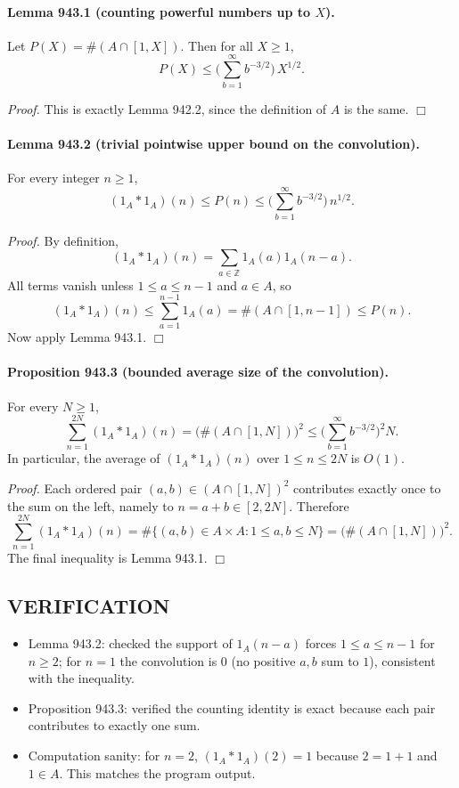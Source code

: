 \paragraph{Lemma 943.1 (counting powerful numbers up to $X$).}
Let $P(X)=\#(A\cap[1,X])$. Then for all $X\ge 1$,
\[
P(X) \le \Big(\sum_{b=1}^{\infty} b^{-3/2}\Big)\, X^{1/2}.
\]

\emph{Proof.}
This is exactly Lemma 942.2, since the definition of $A$ is the same.
\hfill $\Box$

\paragraph{Lemma 943.2 (trivial pointwise upper bound on the convolution).}
For every integer $n\ge 1$,
\[
(1_A*1_A)(n) \le P(n) \le \Big(\sum_{b=1}^{\infty} b^{-3/2}\Big)\, n^{1/2}.
\]

\emph{Proof.}
By definition,
\[
(1_A*1_A)(n)=\sum_{a\in\mathbb{Z}} 1_A(a)1_A(n-a).
\]
All terms vanish unless $1\le a\le n-1$ and $a\in A$, so
\[
(1_A*1_A)(n)\le \sum_{a=1}^{n-1}1_A(a)=\#(A\cap[1,n-1])\le P(n).
\]
Now apply Lemma 943.1.
\hfill $\Box$

\paragraph{Proposition 943.3 (bounded average size of the convolution).}
For every $N\ge 1$,
\[
\sum_{n=1}^{2N} (1_A*1_A)(n) = \big(\#(A\cap[1,N])\big)^2 \le \Big(\sum_{b=1}^{\infty} b^{-3/2}\Big)^2 N.
\]
In particular, the average of $(1_A*1_A)(n)$ over $1\le n\le 2N$ is $O(1)$.

\emph{Proof.}
Each ordered pair $(a,b)\in (A\cap[1,N])^2$ contributes exactly once to the sum on the left, namely to $n=a+b\in[2,2N]$. Therefore
\[
\sum_{n=1}^{2N} (1_A*1_A)(n)=\#\{(a,b)\in A\times A: 1\le a,b\le N\} = \big(\#(A\cap[1,N])\big)^2.
\]
The final inequality is Lemma 943.1.
\hfill $\Box$

\subsection*{VERIFICATION}
\begin{itemize}
\item Lemma 943.2: checked the support of $1_A(n-a)$ forces $1\le a\le n-1$ for $n\ge 2$; for $n=1$ the convolution is $0$ (no positive $a,b$ sum to $1$), consistent with the inequality.
\item Proposition 943.3: verified the counting identity is exact because each pair contributes to exactly one sum.
\item Computation sanity: for $n=2$, $(1_A*1_A)(2)=1$ because $2=1+1$ and $1\in A$. This matches the program output.
\end{itemize}

